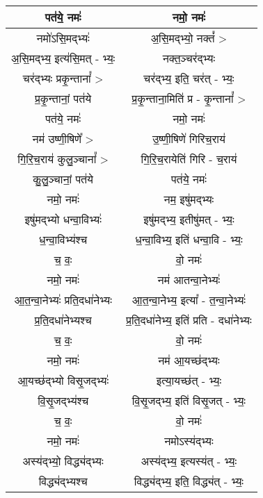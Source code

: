 {\begin{longtable}{|c|c|}
\hline
पत॑ये॒ नमः॑                    & नमो॒ नमः॑ \\
\hline
नमो॑ऽसि॒मद्भ्यः॑                & अ॒सि॒मद्भ्यो॒ नक्तं᳚ > \\
\hline
अ॒सि॒मद्भ्य॒ इत्य॑सि॒मत् - भ्यः॒      & नक्त॒ञ्चर॑द्भ्यः \\
\hline
चर॑द्भ्यः प्रकृ॒न्तानां᳚ >          & चर॑द्भ्य॒ इति॒ चर॑त् - भ्यः॒ \\
\hline
प्र॒कृ॒न्तानां॒ पत॑ये               & प्र॒कृ॒न्ताना॒मिति॑ प्र - कृ॒न्तानां᳚ > \\
\hline
पत॑ये॒ नमः॑                    & नमो॒ नमः॑ \\
\hline
नम॑ उष्णी॒षिणे᳚ >               & उ॒ष्णी॒षिणे॑ गिरिच॒राय॑ \\
\hline
गि॒रि॒च॒राय॑ कुलु॒ञ्चानां᳚ >         & गि॒रि॒च॒रायेति॑ गिरि - च॒राय॑ \\
\hline
कु॒लु॒ञ्चानां॒ पत॑ये                & पत॑ये॒ नमः॑ \\
\hline
नमो॒ नमः॑                    & नम॒ इषु॑मद्भ्यः \\
\hline
इषु॑मद्भ्यो धन्वा॒विभ्यः॑          & इषु॑मद्भ्य॒ इतीषु॑मत् - भ्यः॒ \\
\hline
ध॒न्वा॒विभ्य॑श्च                 & ध॒न्वा॒विभ्य॒ इति॑ धन्वा॒वि - भ्यः॒ \\
\hline
च॒ वः॒                       & वो॒ नमः॑ \\
\hline
नमो॒ नमः॑                    & नम॑ आतन्वा॒नेभ्यः॑ \\
\hline
आ॒त॒न्वा॒नेभ्यः॑ प्रति॒दधा॑नेभ्यः      & आ॒त॒न्वा॒नेभ्य॒ इत्या᳚ - त॒न्वा॒नेभ्यः॑ \\
\hline
प्र॒ति॒दधा॑नेभ्यश्च               & प्र॒ति॒दधा॑नेभ्य॒ इति॑ प्रति - दधा॑नेभ्यः \\
\hline
च॒ वः॒                       & वो॒ नमः॑ \\
\hline
नमो॒ नमः॑                    & नम॑ आ॒यच्छ॑द्भ्यः \\
\hline
आ॒यच्छ॑द्भ्यो विसृ॒जद्भ्यः॑          & इत्या॒यच्छ॑त् - भ्यः॒ \\
\hline
वि॒सृ॒जद्भ्य॑श्च                  & वि॒सृ॒जद्भ्य॒ इति॑ विसृ॒जत् - भ्यः॒ \\
\hline
च॒ वः॒                       & वो॒ नमः॑ \\
\hline
नमो॒ नमः॑                    & नमोऽस्य॑द्भ्यः \\
\hline
अस्य॑द्भ्यो॒ विद्ध्य॑द्भ्यः          & अस्य॑द्भ्य॒ इत्यस्य॑त् - भ्यः॒ \\
\hline
विद्ध्य॑द्भ्यश्च                 & विद्ध्य॑द्भ्य॒ इति॒ विद्ध्य॑त् - भ्यः॒ \\

\end{longtable}}
